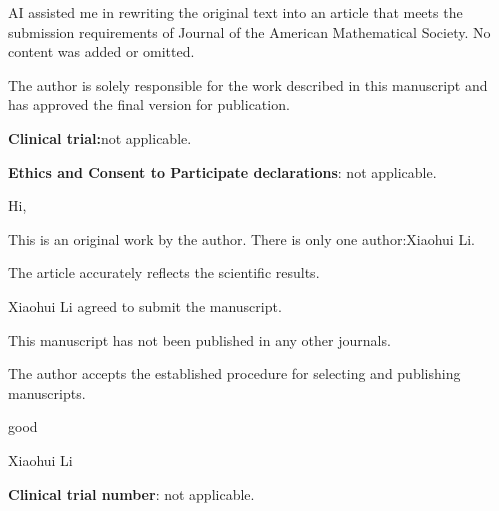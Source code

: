 \documentclass[a4paper,10pt]{article}
\begin{document}
AI assisted me in rewriting the original text into an article that meets the submission requirements of Journal of the American Mathematical Society. No content was added or omitted.

 The author is solely responsible for the work described in this manuscript and has approved the final version for publication.

 \textbf{\textbf{Clinical trial:}}not applicable.

 \textbf{\textbf{Ethics and Consent to Participate declarations}}: not applicable.

 Hi,

This is an original work by the author. There is only one author:Xiaohui Li.

The article accurately reflects the scientific results.

Xiaohui Li agreed to submit the manuscript.

This manuscript has not been published in any other journals.

The author accepts the established procedure for selecting and publishing manuscripts.

good

Xiaohui Li



 \textbf{\textbf{Clinical trial number}}: not applicable.
\end{document}
